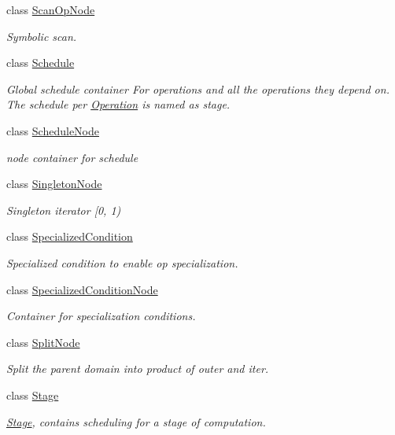 \begin{DoxyCompactItemize}
class \hyperlink{classtvm_1_1te_1_1ScanOpNode}{Scan\+Op\+Node}
\begin{DoxyCompactList}\small\item\em Symbolic scan. \end{DoxyCompactList}\item 
class \hyperlink{classtvm_1_1te_1_1Schedule}{Schedule}
\begin{DoxyCompactList}\small\item\em Global schedule container For operations and all the operations they depend on. The schedule per \hyperlink{classtvm_1_1te_1_1Operation}{Operation} is named as stage. \end{DoxyCompactList}\item 
class \hyperlink{classtvm_1_1te_1_1ScheduleNode}{Schedule\+Node}
\begin{DoxyCompactList}\small\item\em node container for schedule \end{DoxyCompactList}\item 
class \hyperlink{classtvm_1_1te_1_1SingletonNode}{Singleton\+Node}
\begin{DoxyCompactList}\small\item\em Singleton iterator \mbox{[}0, 1) \end{DoxyCompactList}\item 
class \hyperlink{classtvm_1_1te_1_1SpecializedCondition}{Specialized\+Condition}
\begin{DoxyCompactList}\small\item\em Specialized condition to enable op specialization. \end{DoxyCompactList}\item 
class \hyperlink{classtvm_1_1te_1_1SpecializedConditionNode}{Specialized\+Condition\+Node}
\begin{DoxyCompactList}\small\item\em Container for specialization conditions. \end{DoxyCompactList}\item 
class \hyperlink{classtvm_1_1te_1_1SplitNode}{Split\+Node}
\begin{DoxyCompactList}\small\item\em Split the parent domain into product of outer and iter. \end{DoxyCompactList}\item 
class \hyperlink{classtvm_1_1te_1_1Stage}{Stage}
\begin{DoxyCompactList}\small\item\em \hyperlink{classtvm_1_1te_1_1Stage}{Stage}, contains scheduling for a stage of computation. \end{DoxyCompactList}\item 

\end{DoxyCompactItemize}
